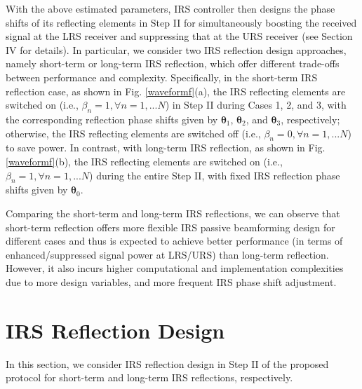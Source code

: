 \documentclass[10pt,final,doublecolumn]{IEEEtran}
\begin{document}
With the above estimated parameters, IRS controller then designs the phase shifts of its reflecting elements in Step II for simultaneously boosting the received signal at the LRS receiver and suppressing that at the URS receiver (see Section IV for details). In particular, we consider two IRS reflection design approaches, namely short-term or long-term IRS reflection, which offer different trade-offs between performance and complexity. Specifically,
in the short-term IRS reflection case, as shown in Fig. \ref{waveformf}(a), the IRS reflecting elements are
switched on (i.e., $\beta_n=1, \forall n=1,...N$) in Step II during Cases 1, 2, and 3, with the corresponding reflection phase shifts given by $\boldsymbol{\theta}_1$, $\boldsymbol{\theta}_2$, and $\boldsymbol{\theta}_3$, respectively; otherwise, the IRS reflecting elements are switched off (i.e., $\beta_n=0, \forall n=1,...N$) to save power. In contrast, with long-term IRS reflection, as shown in Fig. \ref{waveformf}(b), the IRS reflecting elements are switched on (i.e., $\beta_n=1, \forall n=1,...N$) during the entire Step II, with fixed IRS reflection phase shifts given by $\boldsymbol{\theta}_0$.

Comparing the short-term and long-term IRS reflections, we can observe that
short-term reflection offers more flexible IRS passive beamforming design for different cases and thus is expected to achieve better performance (in terms of enhanced/suppressed signal power at LRS/URS) than long-term reflection.
However, it also incurs higher computational and implementation complexities due to more design variables, and more frequent IRS phase shift adjustment.

\section{IRS Reflection Design}
In this section, we consider IRS reflection design in Step II of the proposed protocol for short-term and long-term IRS reflections, respectively.
\end{document}
